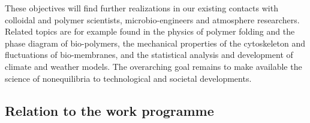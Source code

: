 These objectives will find further realizations in our existing contacts with colloidal and
polymer scientists, microbio-engineers and atmosphere researchers. Related topics are for
example found in the physics of polymer folding and the phase diagram of bio-polymers, the
mechanical properties of the cytoskeleton and fluctuations of bio-membranes, and the
statistical analysis and development of climate and weather models. The overarching goal
remains to make available the science of nonequilibria to technological and societal
developments.



\subsection{Relation to the work programme}\label{sec:relation-wp}

